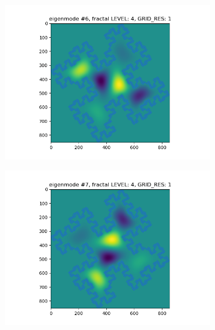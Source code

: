 \documentclass{article}
\begin{document}
\begin{figure}
\begin{subfigure}{0.3\textwidth}
    \end{subfigure}
    \begin{subfigure}{0.3\textwidth}
        \includegraphics[width=\linewidth]{./media/eigenmode_2d6.png}
    \end{subfigure}
    \begin{subfigure}{0.3\textwidth}
        \includegraphics[width=\linewidth]{./media/eigenmode_2d7.png}
    \end{subfigure}
    \begin{subfigure}{0.3\textwidth}

\end{subfigure}
\end{figure}
\end{document}
